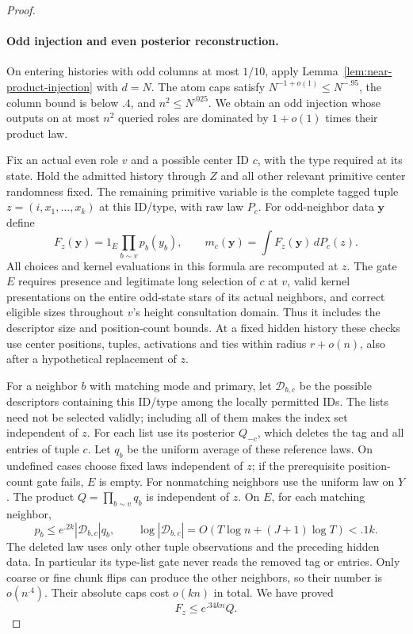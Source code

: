 \begin{proof}
\paragraph{Odd injection and even posterior reconstruction.}

On entering histories with odd columns at most \(1/10\), apply
Lemma~\ref{lem:near-product-injection} with \(d=N\).
The atom caps satisfy \(N^{-1+o(1)}\le N^{-.95}\), the column bound
is below \(.4\), and \(n^2\le N^{.025}\). We obtain an odd injection
whose outputs on at most \(n^2\) queried roles are dominated by
\(1+o(1)\) times their product law.

Fix an actual even role \(v\) and a possible center ID \(c\), with the
type required at its state. Hold the admitted history through \(Z\)
and all other relevant primitive center randomness fixed. The remaining
primitive variable is the complete tagged tuple
\(z=(i,x_1,\ldots,x_k)\) at this ID/type, with raw law \(P_c\).
For odd-neighbor data \(\mathbf y\) define
\[
 F_z(\mathbf y)=1_E\prod_{b\sim v}p_b(y_b),\qquad
 m_c(\mathbf y)=\int F_z(\mathbf y)\,dP_c(z).
\]
All choices and kernel evaluations in this formula are recomputed at
\(z\). The gate \(E\) requires presence and legitimate long selection
of \(c\) at \(v\), valid kernel presentations on the entire odd-state
stars of its actual neighbors, and correct eligible sizes throughout
\(v\)'s height consultation domain. Thus it includes the descriptor
size and position-count bounds. At a fixed hidden history these checks
use center positions, tuples, activations and ties within radius
\(r+o(n)\), also after a hypothetical replacement of \(z\).

For a neighbor \(b\) with matching mode and primary, let
\(\mathcal D_{b,c}\) be the possible descriptors containing this
ID/type among the locally permitted IDs. The lists need not be selected
validly; including all of them makes the index set independent of
\(z\). For each list use its posterior \(Q_{-c}\), which deletes the
tag and all entries of tuple \(c\). Let \(q_b\) be the uniform average
of these reference laws. On undefined cases choose fixed laws
independent of \(z\); if the prerequisite position-count gate fails,
\(E\) is empty. For nonmatching neighbors use the uniform law on \(Y\).
The product \(Q=\prod_{b\sim v}q_b\) is independent of \(z\).
On \(E\), for each matching neighbor,
\[
 p_b\le e^{.2k}|\mathcal D_{b,c}|q_b,
 \qquad
 \log|\mathcal D_{b,c}|
   =O(T\log n+(J+1)\log T)<.1k.
\]
The deleted law uses only other tuple observations and the preceding
hidden data. In particular its type-list gate never reads the removed
tag or entries. Only coarse or fine chunk flips can produce the other
neighbors, so their number is \(o(n^{.4})\). Their absolute caps cost
\(o(kn)\) in total. We have proved
\[
 F_z\le e^{.34kn}Q.
\]


\end{proof}

